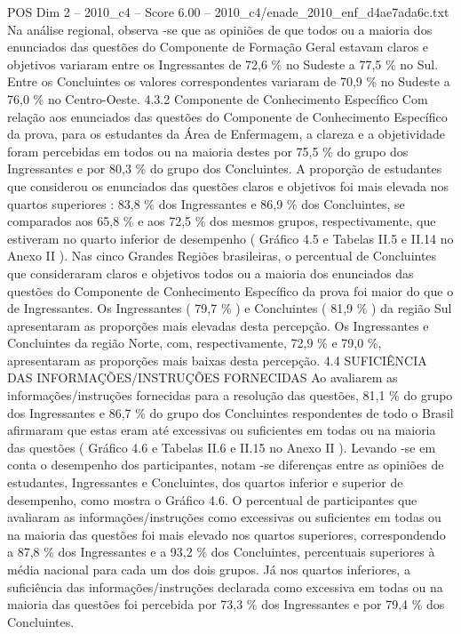 \begin{textsample}{POS Dim 2 – 2010\_c4 – Score 6.00 – 2010\_c4/enade\_2010\_enf\_d4ae7ada6c.txt}
Na análise regional, observa -se que as opiniões de que todos ou a maioria dos enunciados das questões do Componente de Formação Geral estavam claros e objetivos variaram entre os Ingressantes de 72,6 \% no Sudeste a 77,5 \% no Sul.
Entre os Concluintes os valores correspondentes variaram de 70,9 \% no Sudeste a 76,0 \% no Centro-Oeste. 4.3.2 Componente de Conhecimento Específico Com relação aos enunciados das questões do Componente de Conhecimento Específico da prova, para os estudantes da Área de Enfermagem, a clareza e a objetividade foram percebidas em todos ou na maioria destes por 75,5 \% do grupo dos Ingressantes e por 80,3 \% do grupo dos Concluintes.
A proporção de estudantes que considerou os enunciados das questões claros e objetivos foi mais elevada nos quartos superiores : 83,8 \% dos Ingressantes e 86,9 \% dos Concluintes, se comparados aos 65,8 \% e aos 72,5 \% dos mesmos grupos, respectivamente, que estiveram no quarto inferior de desempenho ( Gráfico 4.5 e Tabelas II.5 e II.14 no Anexo II ).
Nas cinco Grandes Regiões brasileiras, o percentual de Concluintes que consideraram claros e objetivos todos ou a maioria dos enunciados das questões do Componente de Conhecimento Específico da prova foi maior do que o de Ingressantes.
Os Ingressantes ( 79,7 \% ) e Concluintes ( 81,9 \% ) da região Sul apresentaram as proporções mais elevadas desta percepção.
Os Ingressantes e Concluintes da região Norte, com, respectivamente, 72,9 \% e 79,0 \%, apresentaram as proporções mais baixas desta percepção. 4.4 SUFICIÊNCIA DAS INFORMAÇÕES/INSTRUÇÕES FORNECIDAS Ao avaliarem as informações/instruções fornecidas para a resolução das questões, 81,1 \% do grupo dos Ingressantes e 86,7 \% do grupo dos Concluintes respondentes de todo o Brasil afirmaram que estas eram até excessivas ou suficientes em todas ou na maioria das questões ( Gráfico 4.6 e Tabelas II.6 e II.15 no Anexo II ).
Levando -se em conta o desempenho dos participantes, notam -se diferenças entre as opiniões de estudantes, Ingressantes e Concluintes, dos quartos inferior e superior de desempenho, como mostra o Gráfico 4.6.
O percentual de participantes que avaliaram as informações/instruções como excessivas ou suficientes em todas ou na maioria das questões foi mais elevado nos quartos superiores, correspondendo a 87,8 \% dos Ingressantes e a 93,2 \% dos Concluintes, percentuais superiores à média nacional para cada um dos dois grupos.
Já nos quartos inferiores, a suficiência das informações/instruções declarada como excessiva em todas ou na maioria das questões foi percebida por 73,3 \% dos Ingressantes e por 79,4 \% dos Concluintes.

\end{textsample}
